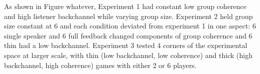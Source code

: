 \documentclass[
  english,
  a4paper,
]{article}
\begin{document}
As shown in Figure whatever, Experiment 1 had constant low group coherence and high listener backchannel while varying group size. Experiment 2 held group size constant at 6 and each condition deviated from experiment 1 in one aspect: 6 single speaker and 6 full feedback changed components of group coherence and 6 thin had a low backchannel. Experiment 3 tested 4 corners of the experimental space at larger scale, with thin (low backchannel, low coherence) and thick (high backchannel, high coherence) games with either 2 or 6 players.







\end{document}
